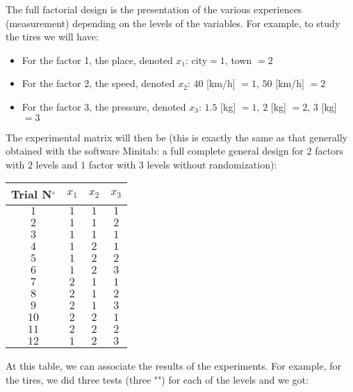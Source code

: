 	
	The full factorial design is the presentation of the various experiences (measurement) depending on the levels of the variables. For example, to study the tires we will have:
	\begin{itemize}
		\item For the factor 1, the place, denoted $x_1$: city$=1$, town $=2$

		\item For the factor 2, the speed, denoted $x_2$: $40$ [km/h] $=1$, $50$ [km/h] $=2$

		\item For the factor 3, the pressure, denoted $x_3$: $1.5$ [kg] $=1$, $2$ [kg] $=2$, $3$ [kg] $=3$
	\end{itemize}
	The experimental matrix will then be (this is exactly the same as that generally obtained with the software Minitab: a full complete general design for $2$ factors with $2$ levels and $1$ factor with $3$ levels without randomization):
	\begin{table}[H]\centering
		\centering
				\begin{tabular}{|c|c|c|c|}
					\hline
					\multicolumn{1}{c}{\cellcolor{black!30}\textbf{Trial N${}^\circ$}} & 
	  \multicolumn{1}{c}{\cellcolor{black!30}$x_1$} & 
	  \multicolumn{1}{c}{\cellcolor{black!30}$x_2$} & 
	  \multicolumn{1}{c}{\cellcolor{black!30}$x_3$} \\ \hline
					$1$ & $1$ & $1$ & $1$\\ \hline
					$2$ & $1$ & $1$ & $2$\\ \hline
					$3$ & $1$ & $1$ & $1$\\ \hline
					$4$ & $1$ & $2$ & $1$\\ \hline
					$5$ & $1$ & $2$ & $2$\\ \hline
					$6$ & $1$ & $2$ & $3$\\ \hline
					$7$ & $2$ & $1$ & $1$\\ \hline
					$8$ & $2$ & $1$ & $2$\\ \hline
					$9$ & $2$ & $1$ & $3$\\ \hline
					$10$ & $2$ & $2$ & $1$\\ \hline
					$11$ & $2$ & $2$ & $2$\\ \hline
					$12$ & $1$ & $2$ & $3$\\ \hline
	 		\end{tabular}
	\end{table}
	At this table, we can associate the results of the experiments. For example, for the tires, we did three tests (three "") for each of the levels and we got:
